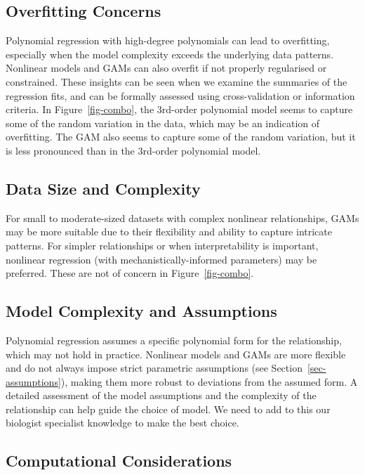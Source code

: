 \documentclass[
  letterpaper,
]{book}
\begin{document}
\subsection{Overfitting Concerns}\label{overfitting-concerns}

Polynomial regression with high-degree polynomials can lead to
overfitting, especially when the model complexity exceeds the underlying
data patterns. Nonlinear models and GAMs can also overfit if not
properly regularised or constrained. These insights can be seen when we
examine the summaries of the regression fits, and can be formally
assessed using cross-validation or information criteria. In
Figure~\ref{fig-combo}, the 3rd-order polynomial model seems to capture
some of the random variation in the data, which may be an indication of
overfitting. The GAM also seems to capture some of the random variation,
but it is less pronounced than in the 3rd-order polynomial model.

\subsection{Data Size and Complexity}\label{data-size-and-complexity}

For small to moderate-sized datasets with complex nonlinear
relationships, GAMs may be more suitable due to their flexibility and
ability to capture intricate patterns. For simpler relationships or when
interpretability is important, nonlinear regression (with
mechanistically-informed parameters) may be preferred. These are not of
concern in Figure~\ref{fig-combo}.

\subsection{Model Complexity and
Assumptions}\label{model-complexity-and-assumptions}

Polynomial regression assumes a specific polynomial form for the
relationship, which may not hold in practice. Nonlinear models and GAMs
are more flexible and do not always impose strict parametric assumptions
(see Section~\ref{sec-assumptions}), making them more robust to
deviations from the assumed form. A detailed assessment of the model
assumptions and the complexity of the relationship can help guide the
choice of model. We need to add to this our biologist specialist
knowledge to make the best choice.

\subsection{Computational
Considerations}\label{computational-considerations}
\end{document}
